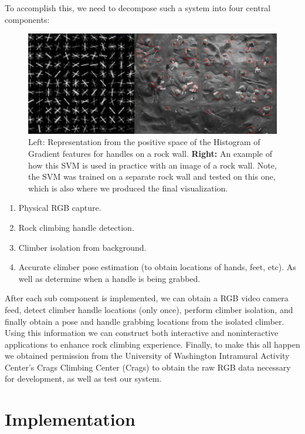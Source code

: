 \documentclass{chi2009}
\begin{document}
To accomplish this, we need to decompose such a system into four central components:

\begin{figure}[t]
  \centering
  \includegraphics[keepaspectratio, width=\textwidth]{figs/svm_wall.jpeg}
  \caption{Left: \normalfont Representation from the positive space of the Histogram of Gradient features for handles on a rock wall. \textbf{Right:} An example of how this SVM is used in practice with an image of a rock wall. Note, the SVM was trained on a separate rock wall and tested on this one, which is also where we produced the final visualization.}
  \label{fig:user}
\end{figure}

\begin{enumerate}
  \itemsep0em
  \item Physical RGB capture.
  \item Rock climbing handle detection.
  \item Climber isolation from background.
  \item Accurate climber pose estimation (to obtain locations of hands, feet, etc). As well as determine when a handle is being grabbed.
\end{enumerate}

After each sub component is implemented, we can obtain a RGB video camera feed, detect climber handle locations (only once), perform climber isolation, and finally obtain a pose and handle grabbing locations from the isolated climber. Using this information we can construct both interactive and noninteractive applications to enhance rock climbing experience. Finally, to make this all happen we obtained permission from the University of Washington Intramural Activity Center's Crags Climbing Center (Crags) to obtain the raw RGB data necessary for development, as well as test our system.

\section{Implementation}
\end{document}
